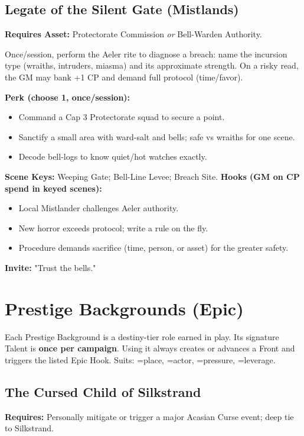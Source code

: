 \subsection{Legate of the Silent Gate (Mistlands)}
\textbf{Requires Asset:} Protectorate Commission \emph{or} Bell-Warden Authority.
\begin{tcolorbox}[enhanced,sharp corners,boxrule=.6pt,title={Talent — Breath-Test (8 XP)}]
Once/session, perform the Aeler rite to diagnose a breach: name the incursion type (wraiths, intruders, miasma) and its approximate strength. On a risky read, the GM may bank +1 CP and demand full protocol (time/favor).
\end{tcolorbox}
\textbf{Perk (choose 1, once/session):}
\begin{itemize}
  \item Command a Cap 3 Protectorate squad to secure a point.
  \item Sanctify a small area with ward-salt and bells; safe vs wraiths for one scene.
  \item Decode bell-logs to know quiet/hot watches exactly.
\end{itemize}
\textbf{Scene Keys:} Weeping Gate; Bell-Line Levee; Breach Site.
\textbf{Hooks (GM on CP spend in keyed scenes):}
\begin{itemize}
  \item Local Mistlander challenges Aeler authority.
  \item New horror exceeds protocol; write a rule on the fly.
  \item Procedure demands sacrifice (time, person, or asset) for the greater safety.
\end{itemize}
\textbf{Invite:} "Trust the bells."

\section{Prestige Backgrounds (Epic)}

Each Prestige Background is a destiny-tier role earned in play. Its signature Talent is \textbf{once per campaign}. Using it always creates or advances a Front and triggers the listed Epic Hook. Suits: \SuitSpade=place, \SuitHeart=actor, \SuitClub=pressure, \SuitDiamond=leverage.

\subsection{The Cursed Child of Silkstrand}
\textbf{Requires:} Personally mitigate or trigger a major Acasian Curse event; deep tie to Silkstrand.


